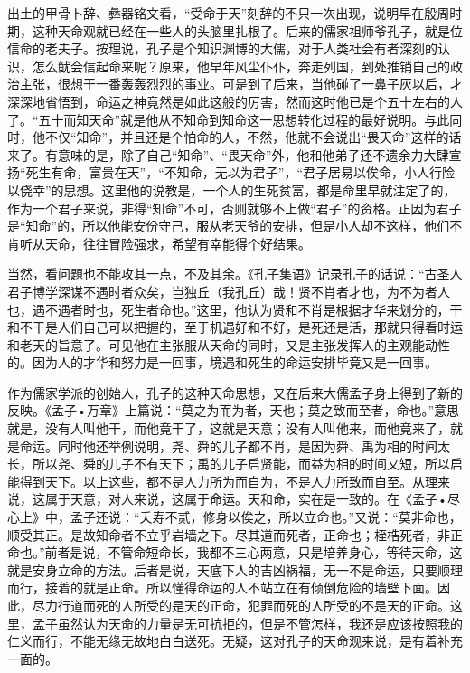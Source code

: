 \documentclass[a5paper,oneside,12pt]{ctexbook}
\begin{document}
出土的甲骨卜辞、彝器铭文看，“受命于天”刻辞的不只一次出现，说明早在殷周时期，这种天命观就已经在一些人的头脑里扎根了。后来的儒家祖师爷孔子，就是位信命的老夫子。按理说，孔子是个知识渊博的大儒，对于人类社会有者深刻的认识，怎么鱿会信起命来呢？原来，他早年风尘仆仆，奔走列国，到处推销自己的政治主张，很想干一番轰轰烈烈的事业。可是到了后来，当他碰了一鼻子灰以后，才深深地省悟到，命运之神竟然是如此这般的厉害，然而这时他已是个五十左右的人了。“五十而知天命”就是他从不知命到知命这一思想转化过程的最好说明。与此同时，他不仅“知命”，并且还是个怕命的人，不然，他就不会说出“畏天命”这样的话来了。有意味的是，除了自己“知命”、“畏天命”外，他和他弟子还不遗余力大肆宣扬“死生有命，富贵在天”，“不知命，无以为君子”，“君子居易以俟命，小人行险以侥幸”的思想。这里他的说教是，一个人的生死贫富，都是命里早就注定了的，作为一个君子来说，非得“知命”不可，否则就够不上做“君子”的资格。正因为君子是“知命”的，所以他能安份守己，服从老天爷的安排，但是小人却不这样，他们不肯听从天命，往往冒险强求，希望有幸能得个好结果。

当然，看问題也不能攻其一点，不及其余。《孔子集语》记录孔子的话说：“古圣人君子博学深谋不遇时者众矣，岂独丘（我孔丘）哉！贤不肖者才也，为不为者人也，遇不遇者时也，死生者命也。”这里，他认为贤和不肖是根据才华来划分的，干和不干是人们自己可以把握的，至于机遇好和不好，是死还是活，那就只得看时运和老天的旨意了。可见他在主张服从天命的同时，又是主张发挥人的主观能动性的。因为人的才华和努力是一回事，境遇和死生的命运安排毕竟又是一回事。

作为儒家学派的创始人，孔子的这种天命思想，又在后来大儒孟子身上得到了新的反映。《孟子•万章》上篇说：“莫之为而为者，天也；莫之致而至者，命也。”意思就是，没有人叫他干，而他竟干了，这就是天意；没有人叫他来，而他竟来了，就是命运。同时他还举例说明，尧、舜的儿子都不肖，是因为舜、禹为相的时间太长，所以尧、舜的儿子不有天下；禹的儿子启贤能，而益为相的时间又短，所以启能得到天下。以上这些，都不是人力所为而自为，不是人力所致而自至。从理来说，这属于天意，对人来说，这属于命运。天和命，实在是一致的。在《孟子•尽心上》中，孟子还说：“夭寿不贰，修身以俟之，所以立命也。”又说：“莫非命也，顺受其正。是故知命者不立乎岩墙之下。尽其道而死者，正命也；桎梏死者，非正命也。”前者是说，不管命短命长，我都不三心两意，只是培养身心，等待天命，这就是安身立命的方法。后者是说，天底下人的吉凶祸福，无一不是命运，只要顺理而行，接着的就是正命。所以懂得命运的人不站立在有倾倒危险的墙壁下面。因此，尽力行道而死的人所受的是天的正命，犯罪而死的人所受的不是天的正命。这里，孟子虽然认为天命的力量是无可抗拒的，但是不管怎样，我还是应该按照我的仁义而行，不能无缘无故地白白送死。无疑，这对孔子的天命观来说，是有着补充一面的。
\end{document}
